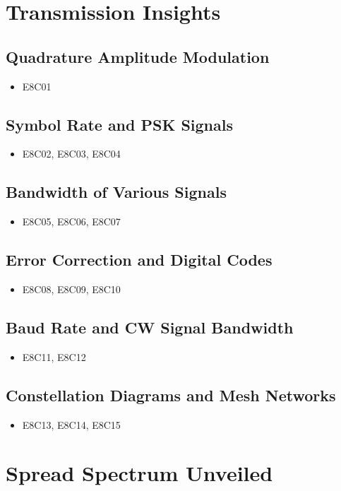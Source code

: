 \documentclass{book}
\begin{document}
\section{Transmission Insights}
\subsection{Quadrature Amplitude Modulation}
\begin{itemize}
    \item E8C01
\end{itemize}
\subsection{Symbol Rate and PSK Signals}
\begin{itemize}
    \item E8C02, E8C03, E8C04
\end{itemize}
\subsection{Bandwidth of Various Signals}
\begin{itemize}
    \item E8C05, E8C06, E8C07
\end{itemize}
\subsection{Error Correction and Digital Codes}
\begin{itemize}
    \item E8C08, E8C09, E8C10
\end{itemize}
\subsection{Baud Rate and CW Signal Bandwidth}
\begin{itemize}
    \item E8C11, E8C12
\end{itemize}
\subsection{Constellation Diagrams and Mesh Networks}
\begin{itemize}
    \item E8C13, E8C14, E8C15
\end{itemize}

\section{Spread Spectrum Unveiled}
\end{document}

